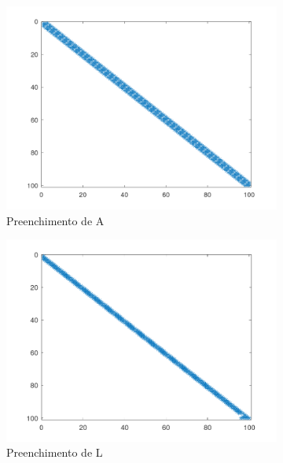 \documentclass{article}
\begin{document}
\begin{figure}[H]
    \centering
    \begin{subfigure}[b]{0.3\textwidth}
         \centering
         \includegraphics[width=\textwidth]{image/tub100spyA.png}
         \caption{Preenchimento de A}
         \label{fig:tub100-spyA}
    \end{subfigure}
    \hfill
    \begin{subfigure}[b]{0.3\textwidth}
         \centering
         \includegraphics[width=\textwidth]{image/tub100spyL.png}
         \caption{Preenchimento de L}
         \label{fig:tub100-spyL}
    \end{subfigure}
    \hfill
    \begin{subfigure}[b]{0.3\textwidth}

\end{subfigure}
\end{figure}
\end{document}
